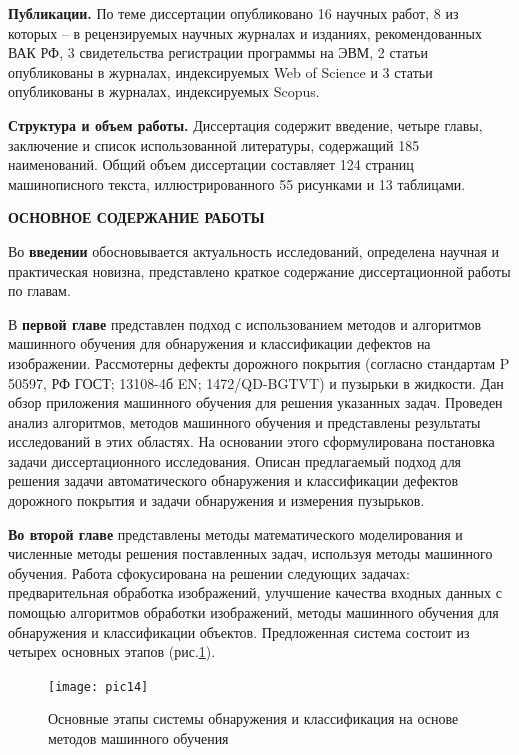 \textbf{Публикации.} По теме диссертации опубликовано 16 научных работ, 8 из которых – в рецензируемых научных журналах и изданиях, рекомендованных ВАК РФ, 3 свидетельства регистрации программы на ЭВМ, 2 статьи опубликованы в журналах, индексируемых Web of Science и 3 статьи опубликованы в журналах, индексируемых Scopus.

\textbf{Структура и объем работы.} Диссертация содержит введение, четыре главы, заключение и список использованной литературы, содержащий 185 наименований. Общий объем диссертации составляет 124 страниц машинописного текста, иллюстрированного 55 рисунками и 13 таблицами.
\begin{center}
\textbf{ОСНОВНОЕ СОДЕРЖАНИЕ РАБОТЫ}
\end{center}

Во {\textbf{введении}} обосновывается актуальность исследований, определена научная и практическая новизна, представлено краткое содержание диссертационной работы по главам.

В \textbf {первой главе} представлен подход с использованием методов и алгоритмов машинного обучения для обнаружения и классификации дефектов на изображении. Рассмотерны дефекты дорожного покрытия (согласно стандартам P 50597, РФ ГОСТ; 13108-4б EN; 1472/QD-BGTVT) и пузырьки в жидкости. Дан обзор приложения машинного обучения для решения указанных задач. Проведен анализ алгоритмов, методов машинного обучения и представлены результаты исследований в этих областях. На основании этого сформулирована постановка задачи диссертационного исследования. Описан предлагаемый подход для решения задачи автоматического обнаружения и классификации дефектов дорожного покрытия и задачи обнаружения и измерения пузырьков.

 \textbf{Во второй главе} представлены методы математического моделирования и численные методы решения поставленных задач, используя методы машинного обучения. Работа сфокусирована на решении следующих задачах: предварительная обработка изображений, улучшение качества входных данных с помощью алгоритмов обработки изображений, методы машинного обучения для обнаружения и классификации объектов. Предложенная система состоит из четырех основных этапов (рис.\ref{pic14}).

\begin{figure}[ht!]
\centering
\texttt{[image: pic14]}
\caption{Основные этапы системы обнаружения и классификация на основе методов машинного обучения}
	\label{pic14}
	\end{figure}

